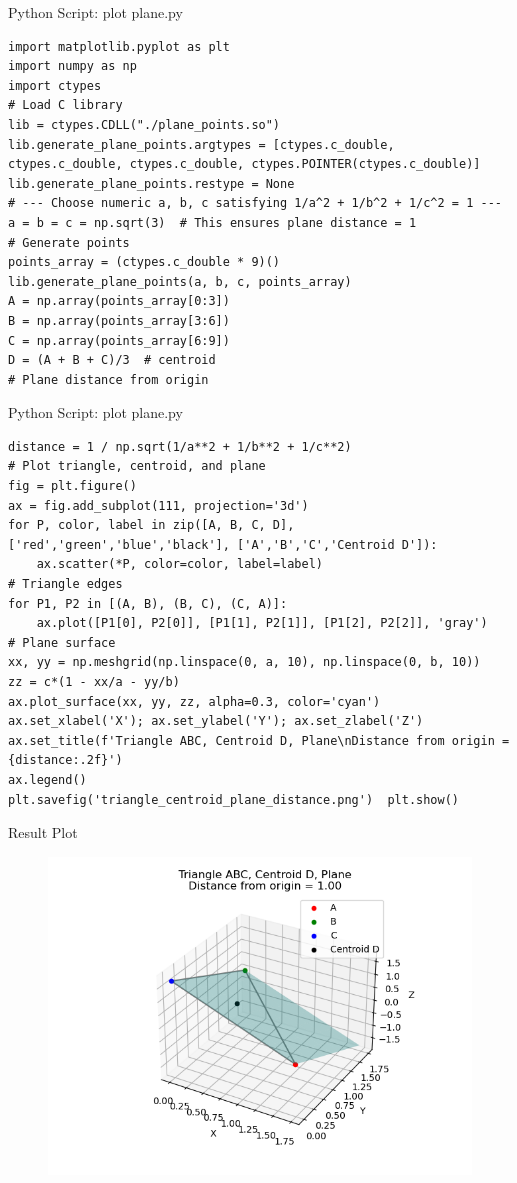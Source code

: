 \documentclass{beamer}
\numberwithin{equation}{section}
\theoremstyle{remark}
\begin{document}
\begin{frame}[fragile]{Python Script: plot plane.py}
\begin{verbatim}
import matplotlib.pyplot as plt
import numpy as np
import ctypes
# Load C library
lib = ctypes.CDLL("./plane_points.so")
lib.generate_plane_points.argtypes = [ctypes.c_double, ctypes.c_double, ctypes.c_double, ctypes.POINTER(ctypes.c_double)]
lib.generate_plane_points.restype = None
# --- Choose numeric a, b, c satisfying 1/a^2 + 1/b^2 + 1/c^2 = 1 ---
a = b = c = np.sqrt(3)  # This ensures plane distance = 1
# Generate points
points_array = (ctypes.c_double * 9)()
lib.generate_plane_points(a, b, c, points_array)
A = np.array(points_array[0:3])
B = np.array(points_array[3:6])
C = np.array(points_array[6:9])
D = (A + B + C)/3  # centroid
# Plane distance from origin
\end{verbatim}
\end{frame}
\begin{frame}[fragile]{Python Script: plot plane.py}
\begin{verbatim}
distance = 1 / np.sqrt(1/a**2 + 1/b**2 + 1/c**2)
# Plot triangle, centroid, and plane
fig = plt.figure()
ax = fig.add_subplot(111, projection='3d')
for P, color, label in zip([A, B, C, D], ['red','green','blue','black'], ['A','B','C','Centroid D']):
    ax.scatter(*P, color=color, label=label)
# Triangle edges
for P1, P2 in [(A, B), (B, C), (C, A)]:
    ax.plot([P1[0], P2[0]], [P1[1], P2[1]], [P1[2], P2[2]], 'gray')
# Plane surface
xx, yy = np.meshgrid(np.linspace(0, a, 10), np.linspace(0, b, 10))
zz = c*(1 - xx/a - yy/b)
ax.plot_surface(xx, yy, zz, alpha=0.3, color='cyan')
ax.set_xlabel('X'); ax.set_ylabel('Y'); ax.set_zlabel('Z')
ax.set_title(f'Triangle ABC, Centroid D, Plane\nDistance from origin = {distance:.2f}')
ax.legend()
plt.savefig('triangle_centroid_plane_distance.png')  plt.show()

\end{verbatim}
\end{frame}

\begin{frame}{Result Plot}
 \begin{figure}[H]
     \centering
     \includegraphics[width=0.8\columnwidth]{figs/fig1.png}
     \caption*{}
     \label{fig:fig1}
 \end{figure}
 
\end{frame}
\end{document}
